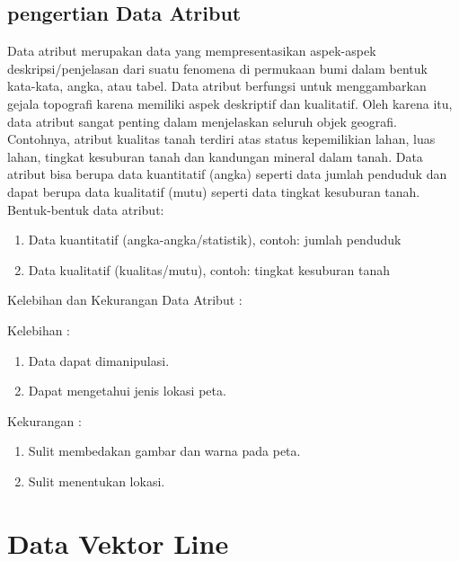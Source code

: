 \subsection{pengertian Data Atribut}
Data atribut merupakan data yang mempresentasikan aspek-aspek deskripsi/penjelasan 
dari suatu fenomena di permukaan bumi dalam bentuk kata-kata, angka, atau tabel. 
Data atribut berfungsi untuk menggambarkan gejala topografi karena memiliki aspek deskriptif dan kualitatif. 
Oleh karena itu, data atribut sangat penting dalam menjelaskan seluruh objek geografi. 
Contohnya, atribut kualitas tanah terdiri atas status kepemilikian lahan, luas lahan, 
tingkat kesuburan tanah dan kandungan mineral dalam tanah. 
Data atribut bisa berupa data kuantitatif (angka) seperti data jumlah penduduk dan dapat berupa data kualitatif (mutu) 
seperti data tingkat kesuburan tanah.  
Bentuk-bentuk data atribut:
\begin{enumerate}
\item	Data kuantitatif (angka-angka/statistik), contoh: jumlah penduduk
\item	Data kualitatif (kualitas/mutu), contoh: tingkat kesuburan tanah
\end{enumerate}

Kelebihan dan Kekurangan Data Atribut :

Kelebihan :
\begin{enumerate}
   \item Data dapat dimanipulasi.
   \item Dapat mengetahui jenis lokasi peta.
\end{enumerate}
Kekurangan :
\begin{enumerate}
   \item Sulit membedakan gambar dan warna pada peta.
   \item Sulit menentukan lokasi.
\end{enumerate}

\section{Data Vektor Line}
